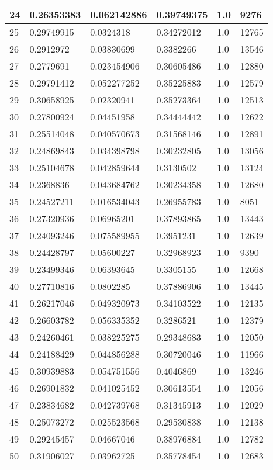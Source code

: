 \begin{longtable}{|l|l|l|l|l|l|}
24 & 0.26353383 & 0.062142886 & 0.39749375 & 1.0 & 9276 \\ \hline 
25 & 0.29749915 & 0.0324318 & 0.34272012 & 1.0 & 12765 \\ \hline 
26 & 0.2912972 & 0.03830699 & 0.3382266 & 1.0 & 13546 \\ \hline 
27 & 0.2779691 & 0.023454906 & 0.30605486 & 1.0 & 12880 \\ \hline 
28 & 0.29791412 & 0.052277252 & 0.35225883 & 1.0 & 12579 \\ \hline 
29 & 0.30658925 & 0.02320941 & 0.35273364 & 1.0 & 12513 \\ \hline 
30 & 0.27800924 & 0.04451958 & 0.34444442 & 1.0 & 12622 \\ \hline 
31 & 0.25514048 & 0.040570673 & 0.31568146 & 1.0 & 12891 \\ \hline 
32 & 0.24869843 & 0.034398798 & 0.30232805 & 1.0 & 13056 \\ \hline 
33 & 0.25104678 & 0.042859644 & 0.3130502 & 1.0 & 13124 \\ \hline 
34 & 0.2368836 & 0.043684762 & 0.30234358 & 1.0 & 12680 \\ \hline 
35 & 0.24527211 & 0.016534043 & 0.26955783 & 1.0 & 8051 \\ \hline 
36 & 0.27320936 & 0.06965201 & 0.37893865 & 1.0 & 13443 \\ \hline 
37 & 0.24093246 & 0.075589955 & 0.3951231 & 1.0 & 12639 \\ \hline 
38 & 0.24428797 & 0.05600227 & 0.32968923 & 1.0 & 9390 \\ \hline 
39 & 0.23499346 & 0.06393645 & 0.3305155 & 1.0 & 12668 \\ \hline 
40 & 0.27710816 & 0.0802285 & 0.37886906 & 1.0 & 13445 \\ \hline 
41 & 0.26217046 & 0.049320973 & 0.34103522 & 1.0 & 12135 \\ \hline 
42 & 0.26603782 & 0.056335352 & 0.3286521 & 1.0 & 12379 \\ \hline 
43 & 0.24260461 & 0.038225275 & 0.29348683 & 1.0 & 12050 \\ \hline 
44 & 0.24188429 & 0.044856288 & 0.30720046 & 1.0 & 11966 \\ \hline 
45 & 0.30939883 & 0.054751556 & 0.4046869 & 1.0 & 13246 \\ \hline 
46 & 0.26901832 & 0.041025452 & 0.30613554 & 1.0 & 12056 \\ \hline 
47 & 0.23834682 & 0.042739768 & 0.31345913 & 1.0 & 12029 \\ \hline 
48 & 0.25073272 & 0.025523568 & 0.29530838 & 1.0 & 12138 \\ \hline 
49 & 0.29245457 & 0.04667046 & 0.38976884 & 1.0 & 12782 \\ \hline 
50 & 0.31906027 & 0.03962725 & 0.35778454 & 1.0 & 12683 \\ \hline 
\end{longtable}